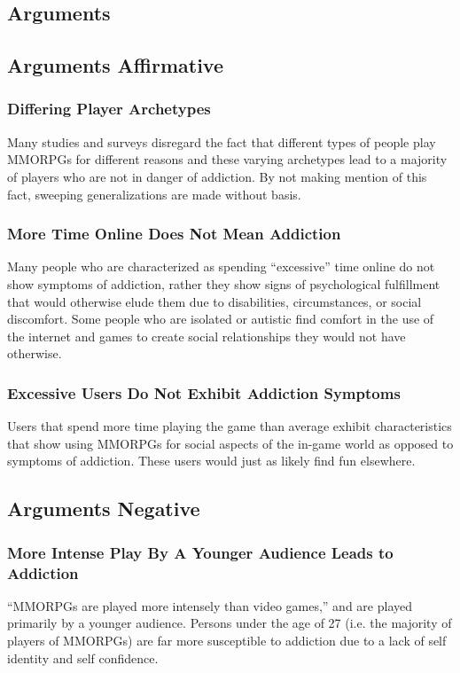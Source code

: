 \documentclass[11pt]{article}
\begin{document}
\begin{multicols}{2}
\section{Arguments}
\subsection{Arguments Affirmative}
\subsubsection{Differing Player Archetypes}
Many studies and surveys disregard the fact that different types of people play MMORPGs for different reasons and these varying archetypes lead to a majority of players who are not in danger of addiction. By not making mention of this fact, sweeping generalizations are made without basis. \cite{PlayerMotivations}
\subsubsection{More Time Online Does Not Mean Addiction}
Many people who are characterized as spending ``excessive'' time online do not show symptoms of addiction, rather they show signs of psychological fulfillment that would otherwise elude them due to disabilities, circumstances, or social discomfort. Some people who are isolated or autistic find comfort in the use of the internet and games to create social relationships they would not have otherwise. \cite{IsThereEvidenceOfInternetAddiction}
\subsubsection{Excessive Users Do Not Exhibit Addiction Symptoms}
Users that spend more time playing the game than average exhibit characteristics that show using MMORPGs for social aspects of the in-game world as opposed to symptoms of addiction. These users would just as likely find fun elsewhere. \cite{ExcessiveUseForSocialAspects}
\subsection{Arguments Negative}
\subsubsection{More Intense Play By A Younger Audience Leads to Addiction}
``MMORPGs are played more intensely than video games,'' and are played primarily by a younger audience. Persons under the age of 27 (i.e. the majority of players of MMORPGs) are far more susceptible to addiction due to a lack of self identity and self confidence. \cite{YoungerAudiencesGetAddicted}

\end{multicols}
\end{document}
